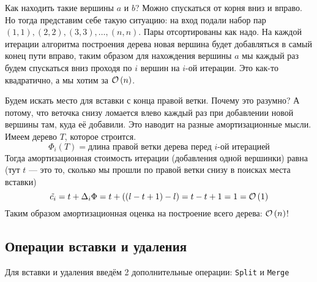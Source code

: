 Как находить такие вершины $a$ и $b$? Можно спускаться от корня вниз и вправо. Но тогда представим себе такую ситуацию: на вход подали набор пар $(1, 1), (2, 2), (3, 3), \ldots, (n, n)$. Пары отсортированы как надо. На каждой итерации алгоритма построения дерева новая вершина будет добавляться в самый конец пути вправо, таким образом для нахождения вершины $a$ мы каждый раз будем спускаться вниз проходя по $i$ вершин на $i$-ой итерации. Это как-то квадратично, а мы хотим за $\mathcal{O}\left(n\right)$.

Будем искать место для вставки с конца правой ветки. Почему это разумно? А потому, что веточка снизу ломается влево каждый раз при добавлении новой вершины там, куда её добавили. Это наводит на разные амортизационные мысли. Имеем дерево $T$, которое строится.
\[
	\Phi_i(T) = \text{длина правой ветки дерева перед $i$-ой итерацией}
\]
Тогда амортизационная стоимость итерации (добавления одной вершинки) равна (тут $t$ --- это то, сколько мы прошли по правой ветки снизу в поисках места вставки)
\[
	\tilde{c_i} = t + \Delta_i \Phi = t + ((l - t + 1) - l) = t - t + 1 = 1 = \mathcal{O}\left(1\right)
\]
Таким образом амортизационная оценка на построение всего дерева: $\mathcal{O}\left(n\right)$!
\subsection{Операции вставки и удаления}
Для вставки и удаления введём 2 дополнительные операции: \texttt{Split} и \texttt{Merge}

